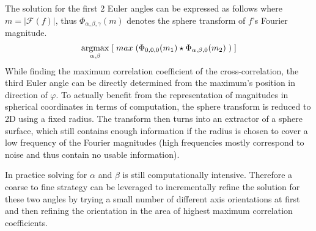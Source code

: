 The solution for the first 2 Euler angles can be expressed as follows where $m = |\mathcal{F}(f)|$, thus $\Phi_{\alpha,\beta,\gamma}(m)$ denotes the sphere transform of $f$'s Fourier magnitude.
\begin{equation}
\operatorname*{argmax}_{\alpha,\beta}\;[\;max\;(\Phi_{0,0,0}(m_1) \star \Phi_{\alpha,\beta,0}(m_2)\;)\;]
\end{equation}
While finding the maximum correlation coefficient of the cross-correlation, the third Euler angle can be directly determined from the maximum's position in direction of $\varphi$.
To actually benefit from the representation of magnitudes in spherical coordinates in terms of computation, the sphere transform is reduced to 2D using a fixed radius. 
The transform then turns into an extractor of a sphere surface, which still contains enough information if the radius is chosen to cover a low frequency of the Fourier magnitudes (high frequencies mostly correspond to noise and thus contain no usable information).

In practice solving for $\alpha$ and $\beta$ is still computationally intensive. 
Therefore a coarse to fine strategy can be leveraged to incrementally refine the solution for these two angles by trying a small number of different axis orientations at first and then refining the orientation in the area of highest maximum correlation coefficients.

